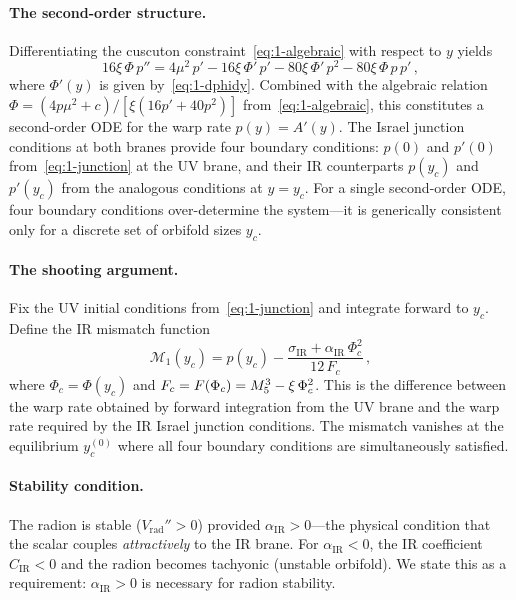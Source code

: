 \paragraph{The second-order structure.} Differentiating the cuscuton constraint~\eqref{eq:1-algebraic} with respect to $y$ yields
\begin{equation}
\label{eq:1-radion-ode}
16\xi\,\Phi\, p'' = 4\mu^2\, p' - 16\xi\,\Phi'\, p' - 80\xi\,\Phi'\, p^2 - 80\xi\,\Phi\, p\, p'\,,
\end{equation}
where $\Phi'(y)$ is given by~\eqref{eq:1-dphidy}. Combined with the algebraic relation $\Phi = (4p\mu^2 + c)/[\xi(16p' + 40p^2)]$ from~\eqref{eq:1-algebraic}, this constitutes a second-order ODE for the warp rate $p(y) = A'(y)$. The Israel junction conditions at both branes provide four boundary conditions: $p(0)$ and $p'(0)$ from~\eqref{eq:1-junction} at the UV brane, and their IR counterparts $p(y_c)$ and $p'(y_c)$ from the analogous conditions at $y = y_c$. For a single second-order ODE, four boundary conditions over-determine the system---it is generically consistent only for a discrete set of orbifold sizes $y_c$.

\paragraph{The shooting argument.} Fix the UV initial conditions from~\eqref{eq:1-junction} and integrate forward to $y_c$. Define the IR mismatch function
\begin{equation}
\label{eq:1-mismatch}
\mathcal{M}_1(y_c) = p(y_c) - \frac{\sigma_{\mathrm{IR}} + \alpha_{\mathrm{IR}}\,\Phi_c^2}{12\, F_c}\,,
\end{equation}
where $\Phi_c = \Phi(y_c)$ and $F_c = F(\Phi_c) = M_5^3 - \xi\,\Phi_c^2$. This is the difference between the warp rate obtained by forward integration from the UV brane and the warp rate required by the IR Israel junction conditions. The mismatch vanishes at the equilibrium $y_c^{(0)}$ where all four boundary conditions are simultaneously satisfied.

\paragraph{Stability condition.} The radion is stable ($V_{\mathrm{rad}}'' > 0$) provided $\alpha_{\mathrm{IR}} > 0$---the physical condition that the scalar couples \emph{attractively} to the IR brane. For $\alpha_{\mathrm{IR}} < 0$, the IR coefficient $C_{\mathrm{IR}} < 0$ and the radion becomes tachyonic (unstable orbifold). We state this as a requirement: $\alpha_{\mathrm{IR}} > 0$ is necessary for radion stability.

